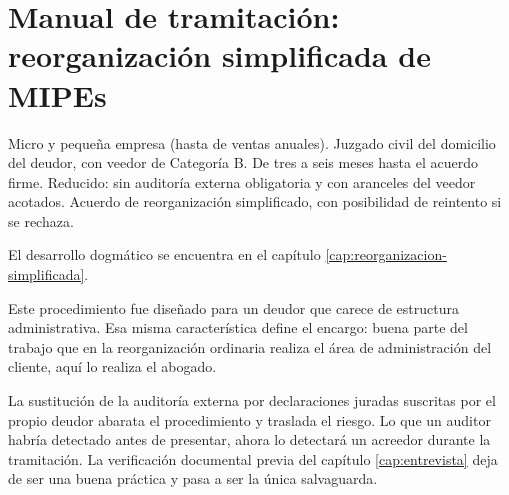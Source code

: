 \chapter{Manual de tramitación: reorganización simplificada de MIPEs}
\label{cap:tram-reorg-simplificada}

\fichaProcedimiento
  {Micro y pequeña empresa (hasta  de ventas anuales).}
  {Juzgado civil del domicilio del deudor, con veedor de Categoría B.}
  {De tres a seis meses hasta el acuerdo firme.}
  {Reducido: sin auditoría externa obligatoria y con aranceles del veedor acotados.}
  {Acuerdo de reorganización simplificado, con posibilidad de reintento si se rechaza.}

El desarrollo dogmático se encuentra en el capítulo
\ref{cap:reorganizacion-simplificada}.

\bloqueEncargo

Este procedimiento fue diseñado para un deudor que carece de estructura administrativa.
Esa misma característica define el encargo: buena parte del trabajo que en la
reorganización ordinaria realiza el área de administración del cliente, aquí lo realiza
el abogado.

\begin{foco}
La sustitución de la auditoría externa por declaraciones juradas suscritas por el propio
deudor abarata el procedimiento y traslada el riesgo. Lo que un auditor habría detectado
antes de presentar, ahora lo detectará un acreedor durante la tramitación. La
verificación documental previa del capítulo \ref{cap:entrevista} deja de ser una buena
práctica y pasa a ser la única salvaguarda.
\end{foco}

\bloqueEntrevista

